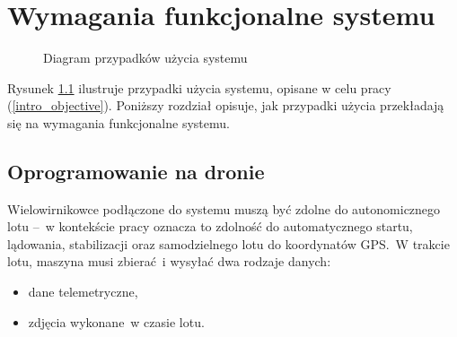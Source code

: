 \chapter{Wymagania funkcjonalne systemu} \label{chapter_functional_requirements}

\begin{figure}[H]
\centering\small
{}
\caption{
    Diagram przypadków użycia systemu
}
\label{top_level_use_case_diagram}
\end{figure}

Rysunek \ref{top_level_use_case_diagram} ilustruje przypadki użycia systemu,
opisane w celu pracy (\ref{intro_objective}). Poniższy rozdział opisuje, jak
przypadki użycia przekładają się na wymagania funkcjonalne systemu.

\section{Oprogramowanie na dronie}

Wielowirnikowce podłączone do systemu muszą być
zdolne do autonomicznego lotu --~w kontekście pracy
oznacza to zdolność do automatycznego startu,
lądowania, stabilizacji oraz samodzielnego
lotu do koordynatów GPS.~W trakcie lotu, maszyna musi
zbierać~i wysyłać dwa rodzaje danych:
\begin{itemize}
    \item dane telemetryczne,
    \item zdjęcia wykonane~w czasie lotu.
\end{itemize}

